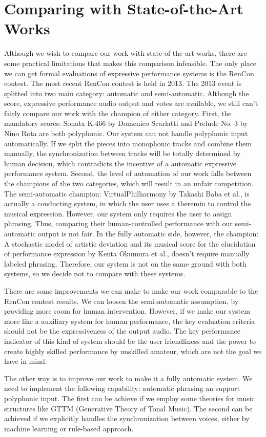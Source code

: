 \section{Comparing with State-of-the-Art Works}
Although we wish to compare our work with state-of-the-art works, there are some practical limitations that makes this comparison infeasible. The only place we can get formal evaluations of expressive performance systems is the RenCon contest\cite{rencon}. The most recent RenCon contest is held in 2013. The 2013 event is splitted into two main category: automatic and semi-automatic. Although the score, expressive performance audio output and votes are available, we still can't fairly compare our work with the champion of either category. First, the mandatory scores: Sonata K.466 by Domenico Scarlatti and Prelude No. 3 by Nino Rota are both polyphonic. Our system can not handle polyphonic input automatically. If we split the pieces into monophonic tracks and combine them manually, the synchronization between tracks will be totally determined by human decision, which contradicts the incentive of a automatic expressive performance system. Second, the level of automation of our work falls between the champions of the two categories, which will result in an unfair competition. The semi-automatic champion: VirtualPhilharmony by Takashi Baba et al.\cite{virtualphil}, is actually a conducting system, in which the user uses a theremin to control the musical expression. However, our system only requires the user to assign phrasing. Thus, comparing their human-controlled performance with our semi-automatic output is not fair. In the fully automatic side, however, the champion: A stochastic model of artistic deviation and its musical score for the
elucidation of performance expression by Kenta Okumura et al., doesn't require manually labeled phrasing. Therefore, our system is not on the same ground with both systems, so we decide not to compare with these systems.

There are some improvements we can make to make our work comparable to the RenCon contest results. We can loosen the semi-automatic assumption, by providing more room for human intervention. However, if we make our system more like a auxiliary system for human performance, the key evaluation criteria should not be the expressiveness of the output audio. The key performance indicator of this kind of system should be the user friendliness and the power to create highly skilled performance by unskilled amateur, which are not the goal we have in mind.

The other way is to improve our work to make it a fully automatic system. We need to implement the following capability: automatic phrasing an support polyphonic input. The first can be achieve if we employ some theories for music structures like GTTM (Generative Theory of Tonal Music)\cite{gttm}. The second can be achieved if we explicitly handles the synchronization between voices, either by machine learning or rule-based approach.



